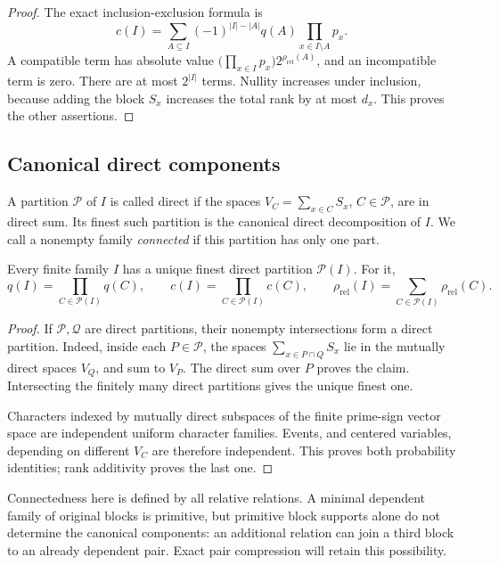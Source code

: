 \begin{proof}
The exact inclusion-exclusion formula is
\[
 c(I)=\sum_{A\subseteq I}(-1)^{|I|-|A|}q(A)
                       \prod_{x\in I\setminus A}p_x.
\]
A compatible term has absolute value
\(\bigl(\prod_{x\in I}p_x\bigr)2^{\rho_{\mathrm{rel}}(A)}\), and an incompatible term is
zero. There are at most \(2^{|I|}\) terms.
Nullity increases under inclusion, because adding the block
\(S_x\) increases the total rank by at most \(d_x\). This proves the other assertions.
\end{proof}

\subsection{Canonical direct components}

A partition \(\mathcal P\) of \(I\) is called direct if
the spaces \(V_C=\sum_{x\in C}S_x\), \(C\in\mathcal P\),
are in direct sum. Its finest such partition is the
canonical direct decomposition of \(I\).
We call a nonempty family \emph{connected} if this
partition has only one part.

\begin{lemma}
\label{p1:alg:components}
Every finite family \(I\) has a unique finest direct
partition \(\mathcal P(I)\). For it,
\begin{equation}
 q(I)=\prod_{C\in\mathcal P(I)}q(C),\qquad
 c(I)=\prod_{C\in\mathcal P(I)}c(C),\qquad
 \rho_{\mathrm{rel}}(I)=\sum_{C\in\mathcal P(I)}\rho_{\mathrm{rel}}(C).
 \label{p1:alg:factorization}
\end{equation}
\end{lemma}

\begin{proof}
If \(\mathcal P,\mathcal Q\) are direct partitions,
their nonempty intersections form a direct partition.
Indeed, inside each \(P\in\mathcal P\), the spaces
\(\sum_{x\in P\cap Q}S_x\) lie in the mutually direct
spaces \(V_Q\), and sum to \(V_P\). The direct sum over
\(P\) proves the claim. Intersecting the finitely many
direct partitions gives the unique finest one.

Characters indexed by mutually direct subspaces of
the finite prime-sign vector space are independent
uniform character families. Events, and centered
variables, depending on different \(V_C\) are therefore
independent. This proves both probability identities;
rank additivity proves the last one.
\end{proof}

Connectedness here is defined by all relative
relations. A minimal dependent family of original
blocks is primitive, but primitive block supports
alone do not determine the canonical components:
an additional relation can join a third block to
an already dependent pair. Exact pair compression
will retain this possibility.
